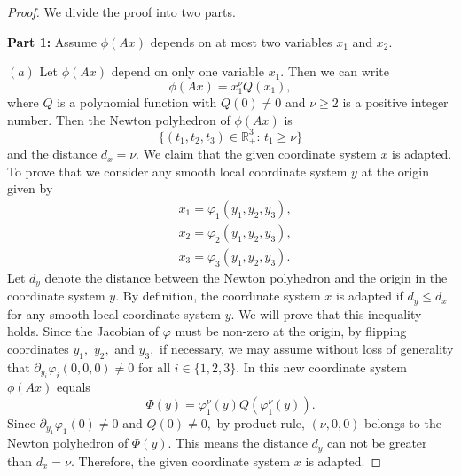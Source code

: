 \documentclass[a4paper, 11pt]{article}
\theoremstyle{plain}
\theoremstyle{definition}
\theoremstyle{lemma}
\theoremstyle{Remark}
\theoremstyle{proposition}
\theoremstyle{corollary}
\theoremstyle{example}
\theoremstyle{assumption}
\begin{document}
\begin{proof}
We divide the proof into two parts.


\textbf{Part 1:} Assume $ \phi(Ax)$ depends on at most two variables $x_1$ and $x_2$.

$(a)$ Let $ \phi(Ax)$ depend on only one variable $x_1.$ Then we can write
$$ \phi(Ax)=x_1^{\nu} Q(x_1),$$
where $ Q$ is a polynomial function with $ Q(0)\neq 0$ and  $\nu\geq 2$ is a positive integer number.  Then the Newton polyhedron of $ \phi(Ax)$ is
$$\{(t_1, t_2, t_3)\in \mathbb{R}^3_+:\, t_1\geq \nu\}$$
and the distance $d_x=\nu.$
We claim that the given  coordinate system  $x$ is adapted. To prove that we consider any smooth local coordinate system $y$ at the origin given by
 \begin{align}\label{new.coor}
 &x_1=\varphi_1(y_1,y_2,y_3), \nonumber\\
 &x_2=\varphi_2(y_1,y_2,y_3), \nonumber \\ & x_3=\varphi_3(y_1,y_2,y_3).
 \end{align}
 Let $d_y$ denote the distance between the Newton polyhedron and the origin in the coordinate system $y.$ By definition, the coordinate system $x$ is adapted if $d_y\leq d_x$ for any smooth local coordinate system $y.$ We will prove that this inequality holds.
Since the Jacobian  of $\varphi$ must be non-zero at the origin, by flipping coordinates $y_1,$ $y_2,$ and $y_3,$ if necessary, we may assume without loss of generality that $\partial_{y_i}\varphi_i(0,0,0)\neq 0 $ for all $i\in \{1,2,3\}.$  %
 In this new coordinate system $\phi (Ax)$ equals
 $$\Phi(y)=\varphi_1^{\nu}(y) Q(\varphi_1^{\nu}(y)).$$
Since $\partial_{y_1}\varphi_1(0)\neq 0$ and $Q(0)\neq 0,$ by product rule, $(\nu,0,0)$ belongs to the Newton polyhedron of $\Phi(y).$ This means  the distance $d_y$ can not be greater than $d_x=\nu.$ Therefore, the given coordinate system $x$ is adapted.



\end{proof}
\end{document}
